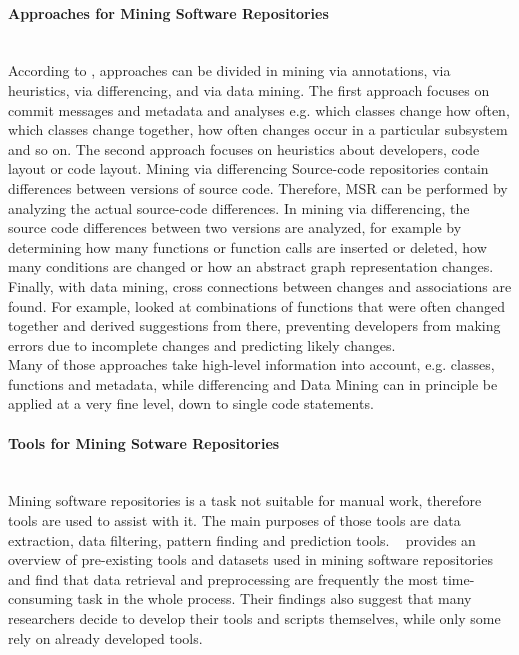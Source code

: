 \documentclass[
	a4paper,
	pagesize,
	pdftex,
	12pt,
	twoside, %
	BCOR=5mm, %
	ngerman,
	fleqn,
	final,
	]{scrartcl}
\begin{document}
\paragraph{Approaches for Mining Software Repositories}\mbox{}\\
According to \cite{Kagdi.2005}, approaches can be divided in mining via annotations, via heuristics, via differencing, and via data mining. The first approach focuses on commit messages and metadata and analyses e.g. which classes change how often, which classes change together, how often changes occur in a particular subsystem and so on. The second approach focuses on heuristics about developers, code layout or code layout. Mining via differencing Source-code repositories contain differences between versions of source code. Therefore, MSR can be performed by analyzing the actual source-code differences. In mining via differencing, the source code differences between two versions are analyzed, for example by determining how many functions or function calls are inserted or deleted, how many conditions are changed or how an abstract graph representation changes. Finally, with data mining, cross connections between changes and associations are found. For example, \cite{Zimmermann.2005} looked at combinations of functions that were often changed together and derived suggestions from there, preventing developers from making errors due to incomplete changes and predicting likely changes.\\
Many of those approaches take high-level information into account, e.g. classes, functions and metadata, while differencing and Data Mining can in principle be applied at a very fine level, down to single code statements.
\paragraph{Tools for Mining Sotware Repositories}\mbox{}\\
Mining software repositories is a task not suitable for manual work, therefore tools are used to assist with it. The main purposes of those tools are data extraction, data filtering, pattern finding and prediction tools. ~\cite{Chaturvedi.2013} provides an overview of pre-existing tools and datasets used in mining software repositories and find that data retrieval and preprocessing are frequently the most time-consuming task in the whole process. Their findings also suggest that many researchers decide to develop their tools and scripts themselves, while only some rely on already developed tools. 
\end{document}
